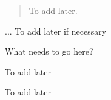
\begin{abstract}
To add later.
\end{abstract}

\begin{layabstract}{...}	%
To add later if necessary
\end{layabstract}


\begin{preface}
What needs to go here?
\end{preface} 

\begin{dedication}
To add later
\end{dedication}

\begin{acknowledgements}
To add later
\end{acknowledgements}

\tableofcontents


\mainmatter

\endinput

